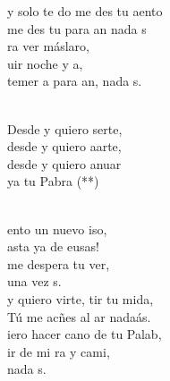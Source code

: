 \documentclass[12pt]{article}
\begin{document}
\begin{multicols*}{2}
\begin{cancion}%
	y solo te do  me des tu aento\\
	 me des tu  para an nada s \\
	ra ver máslaro,\\
	uir noche y a, \\
	temer a  para an, nada s. \\\jump\\
	\begin{chorus}%
	Desde y quiero serte,\\
	desde y quiero aarte,\\
	desde y quiero anuar\\
	ya tu Pabra (**)\\
	\end{chorus}%
	\jump\\
	ento un nuevo iso,\\
	asta ya de eusas!\\
	me despera tu ver,\\
	una vez s. \\
	y quiero virte, tir tu mida,\\
	 Tú me acñes al ar nadaás.\\
	iero hacer cano de tu Palab,\\
	ir de mi ra y cami,\\
	nada s. \\
\end{cancion}%


\end{multicols*}
\end{document}

